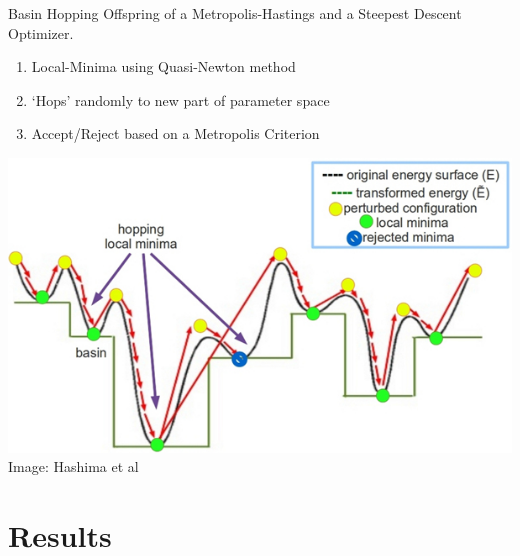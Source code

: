 \documentclass[ignorenonframetext]{beamer}
\begin{document}
\begin{frame}{Basin Hopping}
Offspring of a Metropolis-Hastings and a Steepest Descent Optimizer.
\begin{enumerate}
 \item Local-Minima using Quasi-Newton method
 \item `Hops' randomly to new part of parameter space
 \item Accept/Reject based on a Metropolis Criterion
\end{enumerate}
\begin{center}
\includegraphics[width=0.7\linewidth]{fig/basin_hopping.jpg} \\ {\tiny Image: Hashima et al}
\end{center}


\end{frame}
\section{Results}

\frame{\tableofcontents[currentsection]}
\end{document}
